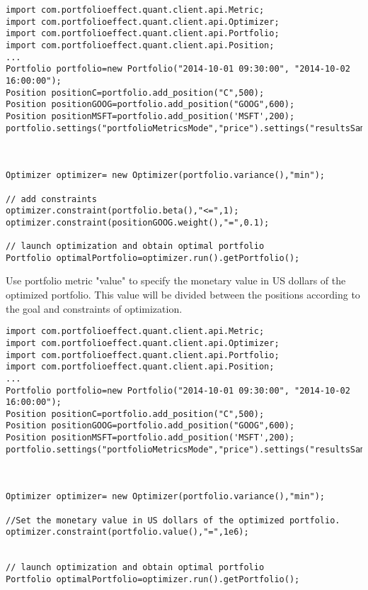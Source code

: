 \documentclass[letterpaper]{report}
\begin{document}
\begin{lstlisting}
import com.portfolioeffect.quant.client.api.Metric;
import com.portfolioeffect.quant.client.api.Optimizer;
import com.portfolioeffect.quant.client.api.Portfolio;
import com.portfolioeffect.quant.client.api.Position;
...
Portfolio portfolio=new Portfolio("2014-10-01 09:30:00", "2014-10-02 16:00:00");
Position positionC=portfolio.add_position("C",500);
Position positionGOOG=portfolio.add_position("GOOG",600);	
Position positionMSFT=portfolio.add_position('MSFT',200);	
portfolio.settings("portfolioMetricsMode","price").settings("resultsSamplingInterval","30m");



Optimizer optimizer= new Optimizer(portfolio.variance(),"min");

// add constraints
optimizer.constraint(portfolio.beta(),"<=",1);
optimizer.constraint(positionGOOG.weight(),"=",0.1);

// launch optimization and obtain optimal portfolio
Portfolio optimalPortfolio=optimizer.run().getPortfolio();
\end{lstlisting}

Use portfolio metric "value" to specify the monetary value in US dollars of the optimized portfolio.
This value will be divided between the positions according to the goal and constraints of optimization.

\begin{lstlisting}
import com.portfolioeffect.quant.client.api.Metric;
import com.portfolioeffect.quant.client.api.Optimizer;
import com.portfolioeffect.quant.client.api.Portfolio;
import com.portfolioeffect.quant.client.api.Position;
...
Portfolio portfolio=new Portfolio("2014-10-01 09:30:00", "2014-10-02 16:00:00");
Position positionC=portfolio.add_position("C",500);
Position positionGOOG=portfolio.add_position("GOOG",600);	
Position positionMSFT=portfolio.add_position('MSFT',200);	
portfolio.settings("portfolioMetricsMode","price").settings("resultsSamplingInterval","30m");



Optimizer optimizer= new Optimizer(portfolio.variance(),"min");

//Set the monetary value in US dollars of the optimized portfolio.
optimizer.constraint(portfolio.value(),"=",1e6);


// launch optimization and obtain optimal portfolio
Portfolio optimalPortfolio=optimizer.run().getPortfolio();


\end{lstlisting}
\end{document}
